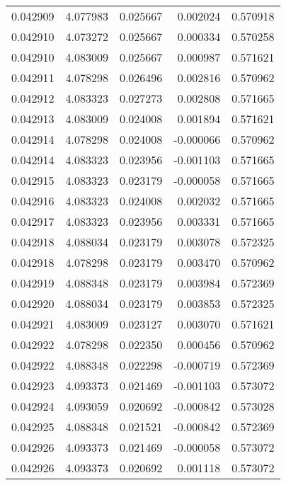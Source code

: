 \begin{tabular}{lrrrr}
0.042909    &  4.077983 &  0.025667 &  0.002024 &             0.570918 \\
0.042910    &  4.073272 &  0.025667 &  0.000334 &             0.570258 \\
0.042910    &  4.083009 &  0.025667 &  0.000987 &             0.571621 \\
0.042911    &  4.078298 &  0.026496 &  0.002816 &             0.570962 \\
0.042912    &  4.083323 &  0.027273 &  0.002808 &             0.571665 \\
0.042913    &  4.083009 &  0.024008 &  0.001894 &             0.571621 \\
0.042914    &  4.078298 &  0.024008 & -0.000066 &             0.570962 \\
0.042914    &  4.083323 &  0.023956 & -0.001103 &             0.571665 \\
0.042915    &  4.083323 &  0.023179 & -0.000058 &             0.571665 \\
0.042916    &  4.083323 &  0.024008 &  0.002032 &             0.571665 \\
0.042917    &  4.083323 &  0.023956 &  0.003331 &             0.571665 \\
0.042918    &  4.088034 &  0.023179 &  0.003078 &             0.572325 \\
0.042918    &  4.078298 &  0.023179 &  0.003470 &             0.570962 \\
0.042919    &  4.088348 &  0.023179 &  0.003984 &             0.572369 \\
0.042920    &  4.088034 &  0.023179 &  0.003853 &             0.572325 \\
0.042921    &  4.083009 &  0.023127 &  0.003070 &             0.571621 \\
0.042922    &  4.078298 &  0.022350 &  0.000456 &             0.570962 \\
0.042922    &  4.088348 &  0.022298 & -0.000719 &             0.572369 \\
0.042923    &  4.093373 &  0.021469 & -0.001103 &             0.573072 \\
0.042924    &  4.093059 &  0.020692 & -0.000842 &             0.573028 \\
0.042925    &  4.088348 &  0.021521 & -0.000842 &             0.572369 \\
0.042926    &  4.093373 &  0.021469 & -0.000058 &             0.573072 \\
0.042926    &  4.093373 &  0.020692 &  0.001118 &             0.573072 \\

\end{tabular}
